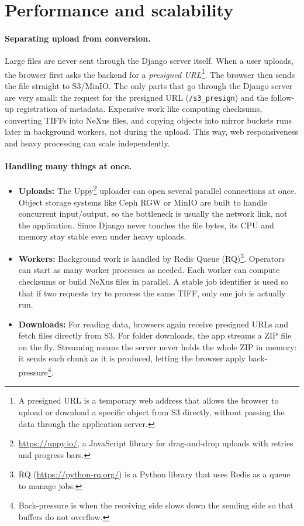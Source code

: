 
\section{Performance and scalability}\label{sec:performance}

\paragraph{Separating upload from conversion.}
Large files are never sent through the Django server itself.  
When a user uploads, the browser first asks the backend for a \emph{presigned URL}\footnote{A presigned URL is a temporary web address that allows the browser to upload or download a specific object from S3 directly, without passing the data through the application server.}.  
The browser then sends the file straight to S3/MinIO.  
The only parts that go through the Django server are very small: the request for the presigned URL (\texttt{/s3\_presign}) and the follow-up registration of metadata.  
Expensive work like computing checksums, converting TIFFs into NeXus files, and copying objects into mirror buckets runs later in background workers, not during the upload.  
This way, web responsiveness and heavy processing can scale independently.

\paragraph{Handling many things at once.}
\begin{itemize}
	\item \textbf{Uploads:} The Uppy\footnote{\url{https://uppy.io/}, a JavaScript library for drag-and-drop uploads with retries and progress bars.} uploader can open several parallel connections at once.  
	Object storage systems like Ceph RGW or MinIO are built to handle concurrent input/output, so the bottleneck is usually the network link, not the application.  
	Since Django never touches the file bytes, its CPU and memory stay stable even under heavy uploads.  
	
	\item \textbf{Workers:} Background work is handled by Redis Queue (RQ)\footnote{RQ (\url{https://python-rq.org/}) is a Python library that uses Redis as a queue to manage jobs.}.  
	Operators can start as many worker processes as needed.  
	Each worker can compute checksums or build NeXus files in parallel.  
	A stable job identifier is used so that if two requests try to process the same TIFF, only one job is actually run.  
	
	\item \textbf{Downloads:} For reading data, browsers again receive presigned URLs and fetch files directly from S3.  
	For folder downloads, the app streams a ZIP file on the fly.  
	Streaming means the server never holds the whole ZIP in memory: it sends each chunk as it is produced, letting the browser apply back-pressure\footnote{Back-pressure is when the receiving side slows down the sending side so that buffers do not overflow.}.
\end{itemize}

